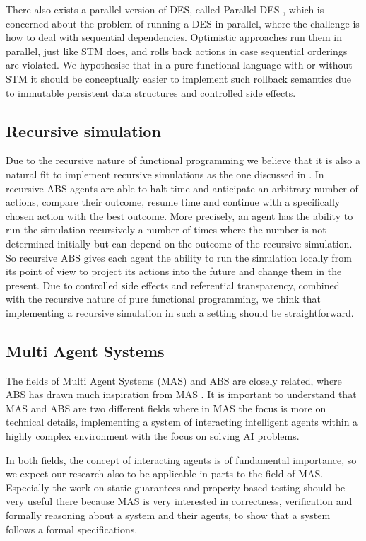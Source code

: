 There also exists a parallel version of DES, called Parallel DES \cite{fujimoto_parallel_2017}, which is concerned about the problem of running a DES in parallel, where the challenge is how to deal with sequential dependencies. Optimistic approaches run them in parallel, just like STM does, and rolls back actions in case sequential orderings are violated. We hypothesise that in a pure functional language with or without STM it should be conceptually easier to implement such rollback semantics due to immutable persistent data structures and controlled side effects.
 
\subsection{Recursive simulation}
Due to the recursive nature of functional programming we believe that it is also a natural fit to implement recursive simulations as the one discussed in \cite{gilmer_recursive_2000}. In recursive ABS agents are able to halt time and anticipate an arbitrary number of actions, compare their outcome, resume time and continue with a specifically chosen action with the best outcome. More precisely, an agent has the ability to run the simulation recursively a number of times where the number is not determined initially but can depend on the outcome of the recursive simulation. So recursive ABS gives each agent the ability to run the simulation locally from its point of view to project its actions into the future and change them in the present. Due to controlled side effects and referential transparency, combined with the recursive nature of pure functional programming, we think that implementing a recursive simulation in such a setting should be straightforward.

\subsection{Multi Agent Systems}
The fields of Multi Agent Systems (MAS) and ABS are closely related, where ABS has drawn much inspiration from MAS \cite{weiss_multiagent_2013,wooldridge_introduction_2009}. It is important to understand that MAS and ABS are two different fields where in MAS the focus is more on technical details, implementing a system of interacting intelligent agents within a highly complex environment with the focus on solving AI problems.

In both fields, the concept of interacting agents is of fundamental importance, so we expect our research also to be applicable in parts to the field of MAS. Especially the work on static guarantees and property-based testing should be very useful there because MAS is very interested in correctness, verification and formally reasoning about a system and their agents, to show that a system follows a formal specifications.